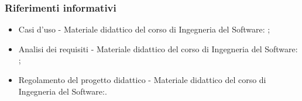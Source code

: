 \subsubsection{Riferimenti informativi}
\begin{itemize}
    \item Casi d'uso - Materiale didattico del corso di Ingegneria del Software: \newline{};
    \item Analisi dei requisiti - Materiale didattico del corso di Ingegneria del Software: \newline {};
    \item Regolamento del progetto didattico - Materiale didattico del corso di Ingegneria del Software:\newline {}.
\end{itemize}


